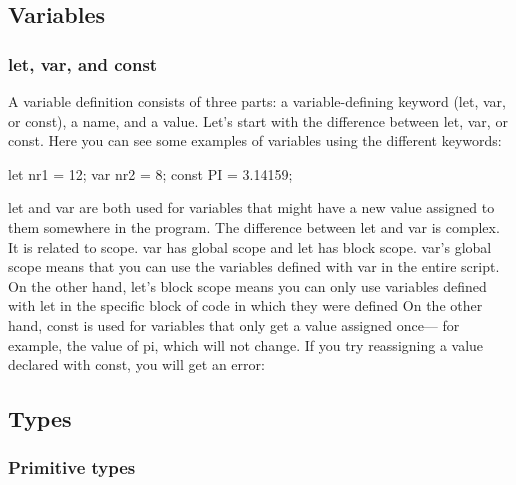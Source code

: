 \documentclass{report}
\begin{document}
    \pagebreak 
    \bigbreak \noindent 
    \subsection{Variables}
    \bigbreak \noindent 
    \subsubsection{let, var, and const}
    \bigbreak \noindent 
    A variable definition consists of three parts: a variable-defining keyword (let, var, or const), a name, and a value. Let's start with the difference between let, var, or const. Here you can see some examples of variables using the different keywords:
    \bigbreak \noindent 
    \begin{jscode}
        let nr1 = 12;
        var nr2 = 8;
        const PI = 3.14159;
    \end{jscode}
    \bigbreak \noindent 
    let and var are both used for variables that might have a new value assigned to them somewhere in the program. The difference between let and var is complex. It is related to scope.
    \bigbreak \noindent 
    var has global scope and let has block scope. var's global scope means that you can use the variables defined with var in the entire script. On the other hand, let's block scope means you can only use variables defined with let in the specific block of code in which they were defined
    \bigbreak \noindent 
    On the other hand, const is used for variables that only get a value assigned once— for example, the value of pi, which will not change. If you try reassigning a value declared with const, you will get an error:

    \bigbreak \noindent 
    \subsection{Types}
    \bigbreak \noindent 
    \subsubsection{Primitive types}
    \bigbreak \noindent 
























    
\end{document}
